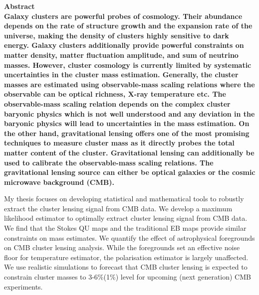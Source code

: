 \bfseries{Abstract}\mdseries\\                                                                                                
                                                                                                                             

Galaxy clusters are powerful probes of cosmology. 
Their abundance depends on the rate of structure growth and the expansion rate of the universe, making the density of clusters highly sensitive to dark energy. 
Galaxy clusters additionally provide powerful constraints on matter density, matter fluctuation amplitude, and sum of neutrino masses.
 However, cluster cosmology is currently limited by systematic uncertainties in the cluster mass estimation.
 Generally, the cluster masses are estimated using observable-mass scaling relations where the observable can be optical richness, X-ray temperature etc.
 The observable-mass scaling relation depends on the complex cluster baryonic physics which is not well understood and any deviation in the baryonic physics will lead to uncertainties in the mass estimation.
 On the other hand, gravitational lensing offers one of the most promising techniques to measure cluster mass as it directly probes the total matter content of the cluster. Gravitational lensing can additionally be used to calibrate the observable-mass scaling relations.
 The gravitational lensing source can either be optical galaxies or the cosmic microwave background (CMB). %
 
My thesis focuses on developing statistical and mathematical tools to robustly extract the cluster lensing signal from CMB data. 
 We develop a maximum likelihood estimator to optimally extract cluster lensing signal from CMB data. 
 We find that the Stokes QU maps and the traditional EB maps provide similar constraints on mass estimates. 
  We quantify the effect of astrophysical foregrounds on CMB cluster lensing analysis. %
  While the foregrounds set an effective noise floor for temperature estimator, the polarisation estimator is largely unaffected. 
  We use realistic simulations to forecast that CMB cluster lensing is expected to constrain cluster masses to 3-6\%(1\%) level for upcoming (next generation) CMB experiments. 
 
